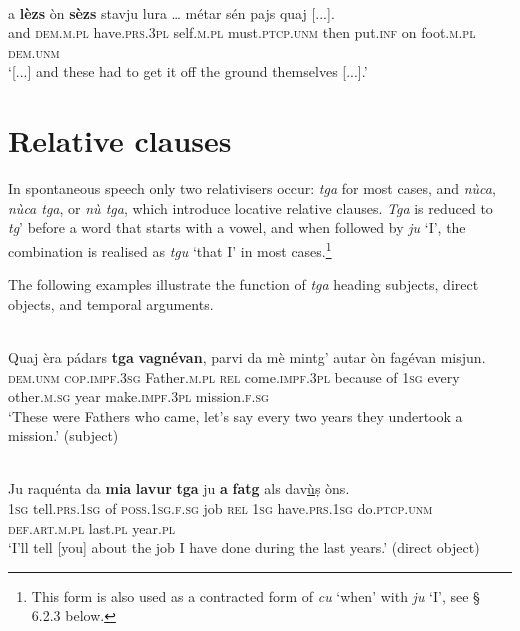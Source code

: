 \ea
\label{ex:sezs3pl}
\\
\gll [...] a \textbf{lèzs} òn \textbf{sèzs} stavju lura … métar sén pajs quaj [...]. \\
{} and \textsc{dem.m.pl} have.\textsc{prs.3pl} self.\textsc{m.pl} must.\textsc{ptcp.unm} then {} put.\textsc{inf} on foot.\textsc{m.pl} \textsc{dem.unm}\\
\glt `[...] and these had to get it off the ground themselves [...].'
\z


\section{Relative clauses}
In spontaneous speech only two relativisers occur: \textit{tga} for most cases, and \textit{nùca}, \textit{nùca tga}, or \textit{nù tga}, which introduce locative relative clauses. \textit{Tga} is reduced to \textit{tg}' before a word that starts with a vowel, and when followed by \textit{ju} `I', the combination is realised as \textit{tgu} `that I' in most cases.\footnote{This form is also used as a contracted form of \textit{cu} `when' with \textit{ju} `I', see § 6.2.3 below.}

The following examples illustrate the function of \textit{tga} heading subjects, direct objects, and temporal arguments.

\ea\label{}
\\
\gll   Quaj èra pádars \textbf{tga} \textbf{vagnévan}, parvi da mè mintg’ autar òn fagévan misjun. \\
\textsc{dem.unm} \textsc{cop.impf.3sg} Father.\textsc{m.pl} \textsc{rel} come.\textsc{impf.3pl} because of \textsc{1sg} every other.\textsc{m.sg} year make.\textsc{impf.3pl} mission.\textsc{f.sg} \\
\glt `These were Fathers who came, let’s say every two years they undertook a mission.' (subject)
\z

\ea\label{}
\\
\gll   Ju raquénta da \textbf{mia} \textbf{lavur} \textbf{tga} ju \textbf{\textbf{a}} \textbf{fatg} als dav\underline{ù}ṣ òns. \\
\textsc{1sg} tell.\textsc{prs.1sg} of \textsc{poss.1sg.f.sg} job \textsc{rel} \textsc{1sg}  have.\textsc{prs.1sg} do.\textsc{ptcp.unm} \textsc{def.art.m.pl} last.\textsc{pl} year.\textsc{pl}\\
\glt `I’ll tell [you] about the job I have done during the last years.' (direct object)
\z

